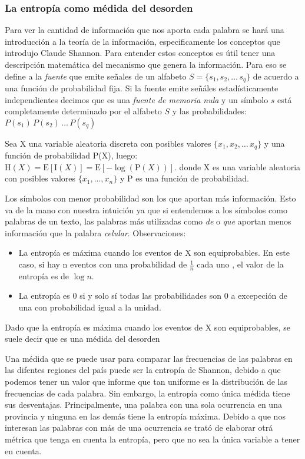 \subsubsection{La entropía como médida del desorden}

Para ver la cantidad de información que nos aporta cada palabra se hará una introducción a la teoría de la información, especificamente
los conceptos que introdujo Claude Shannon\cite{shannon2001mathematical}.
Para entender estos conceptos es útil tener una descripción matemática del mecanismo que genera la información. Para eso se define a 
la \textit{fuente} que emite señales de un alfabeto $ S = \{s_1, s_2, \dots\, s_q\}$ de acuerdo a una función de probabilidad fija.
Si la fuente emite señáles estadísticamente independientes decimos que es una \textit{fuente de memoria nula} y un símbolo $s$ está completamente determinado por el alfabeto $S$ y las probabilidades:
$P(s_1)\,P(s_2)\, \dots\, P(s_q)$

Sea X una variable aleatoria discreta con posibles valores $\{x_1, x_2, \dots\, x_q\}$ y una función de probabilidad P(X), luego:
${\displaystyle \mathrm {H} (X)=\mathrm {E} [\mathrm {I} (X)]=\mathrm {E} [-\log(\mathrm {P} (X))].}$
donde X es una variable aleatoria con posibles valores $\{x_1, ... , x_n\}$ y P es una función de probabilidad.

Los símbolos con menor probabilidad son los que aportan más información. Esto va de la mano con nuestra intuición ya que si entendemos a los símbolos como palabras de un texto, las palabras más utilizadas como \textit{de} o \textit{que} aportan menos información que la palabra \textit{celular}. 
Observaciones:
\begin{itemize}
    \item La entropía es máxima cuando los eventos de X son equiprobables. En este caso, si hay n eventos con una probabilidad de $\frac{1}{n}$ cada uno , el valor de la entropía es de $\log n$.
    \item La entropía es 0 si y solo sí todas las probabilidades son 0 a excepeción de una con probabilidad igual a la unidad. 
\end{itemize}

Dado que la entropía es máxima cuando los eventos de X son equiprobables, se suele decir que es una médida del desorden

Una médida que se puede usar para comparar las frecuencias de las palabras en las difentes regiones del país puede ser la entropía de Shannon, debido a que podemos tener un valor que informe que tan uniforme es la distribución de las frecuencias de cada palabra.
Sin embargo, la entropía como única médida tiene sus desventajas. Principalmente, una palabra con una sola ocurrencia en una provincia y ninguna en las demás tiene la entropía máxima. Debido a que nos interesan las palabras con más de una ocurrencia se trató de elaborar otrá métrica que tenga en cuenta la entropía, pero que no sea la única variable a tener en cuenta.


